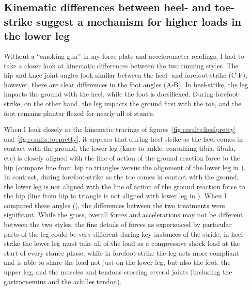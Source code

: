 \subsection{Kinematic differences between heel- and toe-strike suggest a mechanism for higher loads in the lower leg}

Without a ``smoking gun'' in my force plate and accelerometer readings, I had to take a closer look at kinematic differences between the two running styles. The hip and knee joint angles look similar between the heel- and forefoot-strike (C-F), however, there are clear differences in the foot angles (A-B). In heel-strike, the leg impacts the ground with the heel, while the foot is dorsiflexed. During forefoot-strike, on the other hand, the leg impacts the ground first with the toe, and the foot remains plantar flexed for nearly all of stance.

When I look closely at the kinematic tracings of figures~\ref{fig:results:heelpretty} and \ref{fig:results:toepretty}, it appears that during heel-strike as the heel comes in contact with the ground, the lower leg (knee to ankle, containing tibia, fibula, etc) is closely aligned with the line of action of the ground reaction force to the hip (compare line from hip to triangles versus the alignment of the lower leg in ). In contrast, during forefoot-strike as the toe comes in contact with the ground, the lower leg is not aligned with the line of action of the ground reaction force to the hip (line from hip to triangle is not aligned with lower leg in ). When I compared these angles (), the differences between the two treatments were significant. While the gross, overall forces and accelerations may not be different between the two styles, the fine details of forces as experienced by particular parts of the leg could be very different during key instances of the stride; in heel-strike the lower leg must take all of the load as a compressive shock load at the start of every stance phase, while in forefoot-strike the leg acts more compliant and is able to share the load not just on the lower leg, but also the foot, the upper leg, and the muscles and tendons crossing several joints (including the gastrocnemius and the achilles tendon). 

